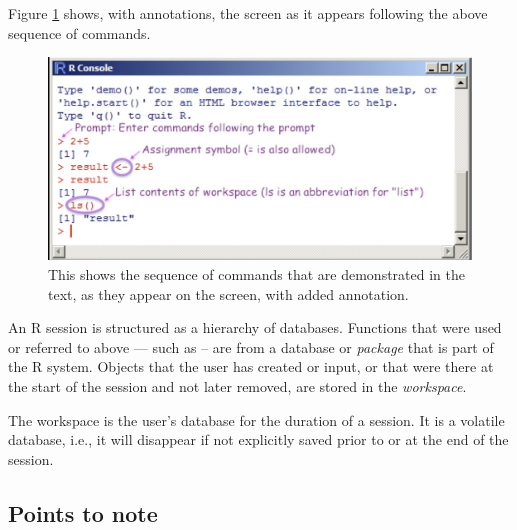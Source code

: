 Figure \ref{fig:cmds} shows, with annotations, the screen as
it appears following the above sequence of commands.

\begin{figure}
\includegraphics{figs-inc/01i-cmds.jpg}
\caption{This shows the sequence of commands that are demonstrated in
  the text, as they appear on the screen, with added
  annotation.\label{fig:cmds}}
\end{figure}

An R session is structured as a hierarchy of databases. Functions that
were used or referred to above --- such as  -- are from a
database or {\em package} that is part of the R system.  Objects that
the user has created or input, or that were there at the start of the
session and not later removed, are stored in the {\em workspace}.

The workspace is the user's database for the duration of a session.
It is a volatile database, i.e., it will disappear if not explicitly
saved prior to or at the end of the session.

\subsection{Points to note}
\noindent
{}
\vspace*{9pt}

